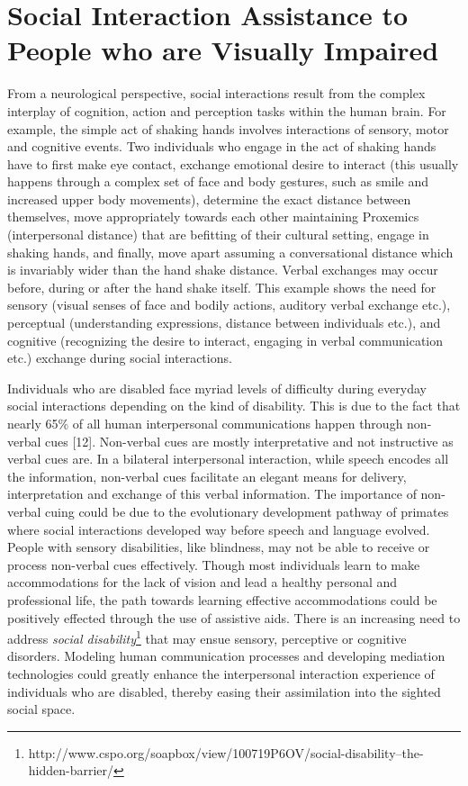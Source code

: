 \documentclass{article} %
\begin{document}
\vspace{-0.1in}
\section{Social Interaction Assistance to People who are Visually Impaired} \label {Sec:SIA}
\vspace{-0.13in}
From a neurological perspective, social interactions result from the complex interplay of cognition, action and perception tasks within the human brain. For example, the simple act of shaking hands involves interactions of sensory, motor and cognitive events. Two individuals who engage in the act of shaking hands have to first make eye contact, exchange emotional desire to interact (this usually happens through a complex set of face and body gestures, such as smile and increased upper body movements), determine the exact distance between themselves, move appropriately towards each other maintaining Proxemics (interpersonal distance) that are befitting of their cultural setting, engage in shaking hands, and finally, move apart assuming a conversational distance which is invariably wider than the hand shake distance. Verbal exchanges may occur before, during or after the hand shake itself. This example shows the need for sensory (visual senses of face and bodily actions, auditory verbal exchange etc.), perceptual (understanding expressions, distance between individuals etc.), and cognitive (recognizing the desire to interact, engaging in verbal communication etc.) exchange during social interactions.

Individuals who are disabled face myriad levels of difficulty during everyday social interactions depending on the kind of disability. This is due to the fact that nearly 65\% of all human interpersonal communications happen through non-verbal cues [12]. Non-verbal cues are mostly interpretative and not instructive as verbal cues are.  In a bilateral interpersonal interaction, while speech encodes all the information, non-verbal cues facilitate an elegant means for delivery, interpretation and exchange of this verbal information. The importance of non-verbal cuing could be due to the evolutionary development pathway of primates where social interactions developed way before speech and language evolved. People with sensory disabilities, like blindness, may not be able to receive or process non-verbal cues effectively. Though most individuals learn to make accommodations for the lack of vision and lead a healthy personal and professional life, the path towards learning effective accommodations could be positively effected through the use of assistive aids. There is an increasing need to address \emph{social disability}\footnote{http://www.cspo.org/soapbox/view/100719P6OV/social-disability--the-hidden-barrier/} that may ensue sensory, perceptive or cognitive disorders. Modeling human communication processes and developing mediation technologies could greatly enhance the interpersonal interaction experience of individuals who are disabled, thereby easing their assimilation into the sighted social space.
\end{document}

